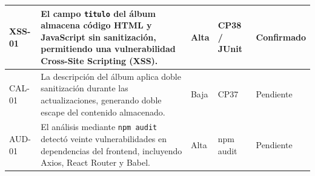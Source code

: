 \begin{table}[H]
\begin{tabular}{|p{1.5cm}|p{5.8cm}|p{2cm}|p{2.8cm}|p{2cm}|}
        XSS-01                                                                                                                                                   &
        El campo \texttt{titulo} del álbum almacena código HTML y JavaScript sin sanitización, permitiendo una vulnerabilidad Cross-Site Scripting (XSS).        &
        Alta                                                                                                                                                     &
        CP38 / JUnit                                                                                                                                             &
        Confirmado                                                                                                                                                 \\
        \hline

        CAL-01                                                                                                                                                   &
        La descripción del álbum aplica doble sanitización durante las actualizaciones, generando doble escape del contenido almacenado.                         &
        Baja                                                                                                                                                     &
        CP37                                                                                                                                                     &
        Pendiente                                                                                                                                                  \\
        \hline

        AUD-01                                                                                                                                                   &
        El análisis mediante \texttt{npm audit} detectó veinte vulnerabilidades en dependencias del frontend, incluyendo Axios, React Router y Babel.            &
        Alta                                                                                                                                                     &
        npm audit                                                                                                                                                &
        Pendiente                                                                                                                                                  \\
        \hline


\end{tabular}
\end{table}
